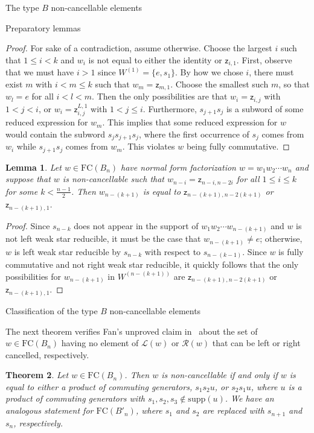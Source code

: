 \documentclass[12pt]{amsart}
\newtheorem{thm}{Theorem}[subsection]
\newtheorem{lem}[thm]{Lemma}
\newcommand{\z}{\mathsf{z}}
\newcommand{\supp}{\mathrm{supp}}
\renewcommand{\L}{\mathcal{L}}
\newcommand{\R}{\mathcal{R}}
\renewcommand{\(}{\left(}
\renewcommand{\)}{\right)}
\newcommand{\FC}{\mathrm{FC}}
\begin{document}
\begin{section}{The type $B$ non-cancellable elements}
\begin{subsection}{Preparatory lemmas}
\begin{proof}
For sake of a contradiction, assume otherwise.  Choose the largest $i$ such that $1\leq i<k$ and $w_{i}$ is not equal to either the identity or $\z_{i,1}$.  First, observe that we must have $i>1$ since $W^{(1)}=\{e,s_1\}$.   By how we chose $i$, there must exist $m$ with $i<m\leq k$ such that $w_m=\z_{m,1}$.   Choose the smallest such $m$, so that $w_{l}=e$ for all $i<l<m$.  Then the only possibilities are that $w_{i}=\z_{i,j}$ with $1<j<i$, or $w_{i}=\z_{i,j}^{L,1}$ with $1<j\leq i$.  Furthermore, $s_{j+1}s_j$ is a subword of some reduced expression for $w_m$.  This implies that some reduced expression for $w$ would contain the subword $s_{j}s_{j+1}s_{j}$, where the first occurrence of $s_j$ comes from $w_i$ while $s_{j+1}s_j$ comes from $w_m$.  This violates $w$ being fully commutative.
\end{proof}

\begin{lem}\label{lem:above_triangle}
Let $w\in \FC(B_{n})$ have normal form factorization $w=w_{1}w_{2}\cdots w_{n}$ and suppose that $w$ is non-cancellable such that $w_{n-i}=\z_{n-i,n-2i}$ for all $1\leq i \leq k$ for some $k<\frac{n-1}{2}$.  Then $w_{n-(k+1)}$ is equal to $\z_{n-(k+1),n-2(k+1)}$ or $\z_{n-(k+1),1}$.
\end{lem}

\begin{proof}
Since $s_{n-k}$ does not appear in the support of $w_{1}w_{2}\cdots w_{n-(k+1)}$ and $w$ is not left weak star reducible, it must be the case that $w_{n-(k+1)}\neq e$; otherwise, $w$ is left weak star reducible by $s_{n-k}$ with respect to $s_{n-(k-1)}$.  Since $w$ is fully commutative and not right weak star reducible, it quickly follows that the only possibilities for $w_{n-(k+1)}$ in $W^{(n-(k+1))}$ are $\z_{n-(k+1),n-2(k+1)}$ or $\z_{n-(k+1),1}$.
\end{proof}

\end{subsection}


\begin{subsection}{Classification of the type $B$ non-cancellable elements}

The next theorem verifies Fan's unproved claim in~\cite[]{Fan.C:A} about the set of $w \in \FC(B_{n})$ having no element of $\L(w)$ or $\R(w)$ that can be left or right cancelled, respectively.  

\begin{thm}\label{thm:Bwsrm}
Let $w \in \FC(B_{n})$.  Then $w$ is non-cancellable if and only if $w$ is equal to either a product of commuting generators, $s_{1}s_{2}u$, or $s_{2}s_{1}u$, where $u$ is a product of commuting generators with $s_{1}, s_{2}, s_{3} \notin \supp(u)$.  We have an analogous statement for $\FC(B'_{n})$, where $s_{1}$ and $s_{2}$ are replaced with $s_{n+1}$ and $s_{n}$, respectively.
\end{thm}


\end{subsection}
\end{section}
\end{document}
